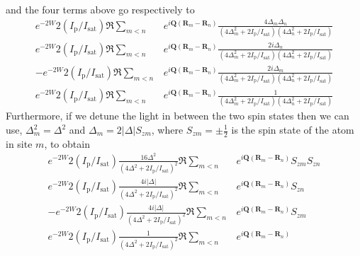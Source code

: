 \documentclass[11pt,letter]{article}
\newcommand{\bv}[1]{\ensuremath{\bm{#1}}}
\newcommand{\iisat}{\ensuremath{I_{\mathrm{p}}/I_{\mathrm{sat}}}}
\begin{document}
and the four terms above go respectively to  
\begin{align} 
     e^{-2W} 2(\iisat)\Re \sum_{m<n} & 
      e^{ i \bv{Q}( \bv{R}_{m} - \bv{R}_{n} ) } 
      \frac{ 4 \Delta_{m} \Delta_{n} } 
           {(4 \Delta_{m}^{2} + 2 \iisat)(4 \Delta_{n}^{2} + 2 \iisat)
 }  \\
     e^{-2W} 2(\iisat)\Re \sum_{m<n} & 
      e^{ i \bv{Q}( \bv{R}_{m} - \bv{R}_{n} ) } 
      \frac{ 2 i \Delta_{n} } 
           {(4 \Delta_{m}^{2} + 2 \iisat)(4 \Delta_{n}^{2} + 2 \iisat)
 }   \\
    -e^{-2W} 2(\iisat) \Re \sum_{m<n} & 
      e^{ i \bv{Q}( \bv{R}_{m} - \bv{R}_{n} ) } 
      \frac{ 2 i \Delta_{m} } 
           {(4 \Delta_{m}^{2} + 2 \iisat)(4 \Delta_{n}^{2} + 2 \iisat)
 }   \\
     e^{-2W} 2(\iisat)\Re \sum_{m<n} & 
      e^{ i \bv{Q}( \bv{R}_{m} - \bv{R}_{n} ) } 
      \frac{ 1} { (4 \Delta_{m}^{2} + 2 \iisat)(4 \Delta_{n}^{2} + 2 \iisat)
}   
\end{align}
Furthermore, if we detune the light in between the two spin states then we can
use, $\Delta_{m}^{2} = \Delta^{2}$ and  $\Delta_{m} = 2|\Delta|S_{zm}$, where
$S_{zm}=\pm\frac{1}{2}$ is the spin state of the atom in site $m$, to obtain
\begin{align} 
     e^{-2W} 2(\iisat)
      \frac{ 16 \Delta^{2}  } 
           {(4 \Delta^{2} + 2 \iisat)^{2} }  
       \Re \sum_{m<n} & 
      e^{ i \bv{Q}( \bv{R}_{m} - \bv{R}_{n} ) } 
      S_{zm}S_{zn}\\
     e^{-2W} 2(\iisat)
      \frac{ 4 i |\Delta| } 
           {(4 \Delta^{2} + 2 \iisat)^{2} }  
      \Re \sum_{m<n} & 
      e^{ i \bv{Q}( \bv{R}_{m} - \bv{R}_{n} ) } 
      S_{zn}  \\
    -e^{-2W} 2(\iisat) 
      \frac{ 4 i |\Delta|} 
           {(4 \Delta^{2} + 2 \iisat)^{2} }  
      \Re \sum_{m<n} & 
      e^{ i \bv{Q}( \bv{R}_{m} - \bv{R}_{n} ) } 
        S_{zm} \\
     e^{-2W} 2(\iisat)
      \frac{ 1} { (4 \Delta^{2} + 2 \iisat)^{2} }   
       \Re \sum_{m<n} & 
      e^{ i \bv{Q}( \bv{R}_{m} - \bv{R}_{n} ) } 
\end{align}
\end{document}
